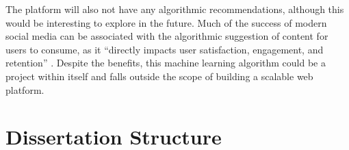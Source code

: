 The platform will also not have any algorithmic recommendations, although this would be interesting to explore in the future.
Much of the success of modern social media can be associated with the algorithmic suggestion of content for users to consume, as it ``directly impacts user satisfaction, engagement, and retention'' \citep{chen2024algocontent}. 
Despite the benefits, this machine learning algorithm could be a project within itself and falls outside the scope of building a scalable web platform.

\section{Dissertation Structure}
\label{sec:intro-structure}
